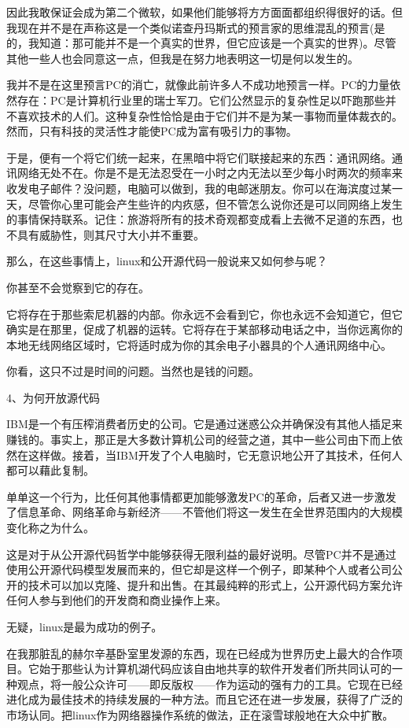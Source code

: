 因此我敢保证会成为第二个微软，如果他们能够将方方面面都组织得很好的话。但我现在并不是在声称这是一个类似诺查丹玛斯式的预言家的思维混乱的预言(是的，我知道：那可能并不是一个真实的世界，但它应该是一个真实的世界)。尽管其他一些人也会同意这一点，但我是在努力地表明这一切是何以发生的。

我并不是在这里预言PC的消亡，就像此前许多人不成功地预言一样。PC的力量依然存在：PC是计算机行业里的瑞士军刀。它们公然显示的复杂性足以吓跑那些并不喜欢技术的人们。这种复杂性恰恰是由于它们并不是为某一事物而量体裁衣的。然而，只有科技的灵活性才能使PC成为富有吸引力的事物。

于是，便有一个将它们统一起来，在黑暗中将它们联接起来的东西：通讯网络。通讯网络无处不在。你是不是无法忍受在一小时之内无法以至少每小时两次的频率来收发电子邮件？没问题，电脑可以做到，我的电邮迷朋友。你可以在海滨度过某一天，尽管你心里可能会产生些许的内疚感，但不管怎么说你还是可以同网络上发生的事情保持联系。记住：旅游将所有的技术奇观都变成看上去微不足道的东西，也不具有威胁性，则其尺寸大小并不重要。

那么，在这些事情上，linux和公开源代码一般说来又如何参与呢？

你甚至不会觉察到它的存在。

它将存在于那些索尼机器的内部。你永远不会看到它，你也永远不会知道它，但它确实是在那里，促成了机器的运转。它将存在于某部移动电话之中，当你远离你的本地无线网络区域时，它将适时成为你的其余电子小器具的个人通讯网络中心。

你看，这只不过是时间的问题。当然也是钱的问题。

 
4、为何开放源代码

IBM是一个有压榨消费者历史的公司。它是通过迷惑公众并确保没有其他人插足来赚钱的。事实上，那正是大多数计算机公司的经营之道，其中一些公司由下而上依然在这样做。接着，当IBM开发了个人电脑时，它无意识地公开了其技术，任何人都可以藉此复制。

单单这一个行为，比任何其他事情都更加能够激发PC的革命，后者又进一步激发了信息革命、网络革命与新经济——不管他们将这一发生在全世界范围内的大规模变化称之为什么。

这是对于从公开源代码哲学中能够获得无限利益的最好说明。尽管PC并不是通过使用公开源代码模型发展而来的，但它却是这样一个例子，即某种个人或者公司公开的技术可以加以克隆、提升和出售。在其最纯粹的形式上，公开源代码方案允许任何人参与到他们的开发商和商业操作上来。

无疑，linux是最为成功的例子。

在我那脏乱的赫尔辛基卧室里发源的东西，现在已经成为世界历史上最大的合作项目。它始于那些认为计算机湖代码应该自由地共享的软件开发者们所共同认可的一种观点，将一般公众许可——即反版权——作为运动的强有力的工具。它现在已经进化成为最佳技术的持续发展的一种方法。而且它还在进一步发展，获得了广泛的市场认同。把linux作为网络器操作系统的做法，正在滚雪球般地在大众中扩散。

